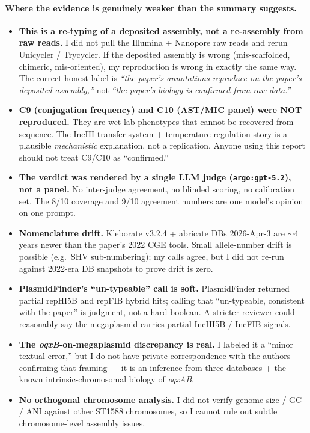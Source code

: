 \documentclass[11pt]{article}
\begin{document}
\paragraph{Where the evidence is genuinely weaker than the summary suggests.}
\begin{itemize}[leftmargin=1.5em,itemsep=2pt]
  \item \textbf{This is a re-typing of a deposited assembly, not a
    re-assembly from raw reads.} I did not pull the Illumina + Nanopore
    raw reads and rerun Unicycler / Trycycler. If the deposited assembly
    is wrong (mis-scaffolded, chimeric, mis-oriented), my reproduction is
    wrong in exactly the same way. The correct honest label is
    \emph{``the paper's annotations reproduce on the paper's deposited
    assembly,''} not \emph{``the paper's biology is confirmed from raw
    data.''}
  \item \textbf{C9 (conjugation frequency) and C10 (AST/MIC panel) were
    NOT reproduced.} They are wet-lab phenotypes that cannot be recovered
    from sequence. The IncHI transfer-system + temperature-regulation
    story is a plausible \emph{mechanistic} explanation, not a
    replication. Anyone using this report should not treat C9/C10 as
    ``confirmed.''
  \item \textbf{The verdict was rendered by a single LLM judge
    (\texttt{argo:gpt-5.2}), not a panel.} No inter-judge agreement, no
    blinded scoring, no calibration set. The 8/10 coverage and 9/10
    agreement numbers are one model's opinion on one prompt.
  \item \textbf{Nomenclature drift.} Kleborate v3.2.4 + abricate DBs
    2026-Apr-3 are $\sim$4 years newer than the paper's 2022 CGE tools.
    Small allele-number drift is possible (e.g.\ SHV sub-numbering);
    my calls agree, but I did not re-run against 2022-era DB snapshots to
    prove drift is zero.
  \item \textbf{PlasmidFinder's ``un-typeable'' call is soft.} PlasmidFinder
    returned partial repHI5B and repFIB hybrid hits; calling that
    ``un-typeable, consistent with the paper'' is judgment, not a hard
    boolean. A stricter reviewer could reasonably say the megaplasmid
    carries partial IncHI5B / IncFIB signals.
  \item \textbf{The \emph{oqxB}-on-megaplasmid discrepancy is real.}
    I labeled it a ``minor textual error,'' but I do not have private
    correspondence with the authors confirming that framing --- it is
    an inference from three databases + the known intrinsic-chromosomal
    biology of \emph{oqxAB}.
  \item \textbf{No orthogonal chromosome analysis.} I did not verify
    genome size / GC / ANI against other ST1588 chromosomes, so I cannot
    rule out subtle chromosome-level assembly issues.
\end{itemize}
\end{document}
